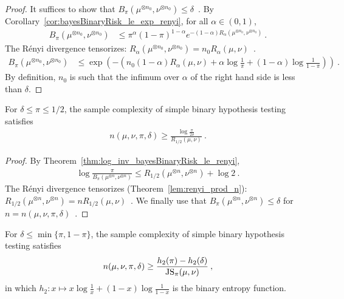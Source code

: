 \begin{proof}%
{}
It suffices to show that $B_\pi(\mu^{\otimes n_0}, \nu^{\otimes n_0}) \le \delta$~.
By Corollary~\ref{cor:bayesBinaryRisk_le_exp_renyi}, for all $\alpha \in (0,1)$,
\begin{align*}
B_\pi(\mu^{\otimes n_0}, \nu^{\otimes n_0})
&\le \pi^{\alpha} (1 - \pi)^{1 - \alpha}e^{- (1 - \alpha)R_\alpha(\mu^{\otimes n_0}, \nu^{\otimes n_0})}
\: .
\end{align*}
The Rényi divergence tensorizes: $R_\alpha(\mu^{\otimes n_0}, \nu^{\otimes n_0}) = n_0 R_\alpha(\mu, \nu)$~.
\begin{align*}
B_\pi(\mu^{\otimes n_0}, \nu^{\otimes n_0})
&\le \exp\left(- \left( n_0 (1 - \alpha)R_\alpha(\mu, \nu) + \alpha\log\frac{1}{\pi} + (1 - \alpha)\log\frac{1}{1 - \pi} \right) \right)
\: .
\end{align*}
By definition, $n_0$ is such that the infimum over $\alpha$ of the right hand side is less than $\delta$.
\end{proof}


\begin{lemma}
  \label{lem:binaryPriorSampleComplexity_ge_renyi}
  For $\delta \le \pi \le 1/2$, the sample complexity of simple binary hypothesis testing satisfies
  \begin{align*}
  n(\mu, \nu, \pi, \delta) \ge \frac{\log\frac{\pi}{2\delta}}{R_{1/2}(\mu, \nu)}
  \: .
  \end{align*}
\end{lemma}

\begin{proof}%
{}
By Theorem~\ref{thm:log_inv_bayesBinaryRisk_le_renyi},
\begin{align*}
\log\frac{\pi}{B_\pi(\mu^{\otimes n}, \nu^{\otimes n})} \le R_{1/2}(\mu^{\otimes n}, \nu^{\otimes n}) + \log 2
\: .
\end{align*}
The Rényi divergence tensorizes (Theorem~\ref{lem:renyi_prod_n}): $R_{1/2}(\mu^{\otimes n}, \nu^{\otimes n}) = n R_{1/2}(\mu, \nu)$~.
We finally use that $B_\pi(\mu^{\otimes n}, \nu^{\otimes n}) \le \delta$ for $n = n(\mu, \nu, \pi, \delta)$~.
\end{proof}


\begin{lemma}
  \label{lem:binaryPriorSampleComplexity_ge_jensenShannon}
  For $\delta \le \min\{\pi, 1 - \pi\}$, the sample complexity of simple binary hypothesis testing satisfies
  \begin{align*}
  n(\mu, \nu, \pi, \delta) \ge \frac{h_2(\pi) - h_2(\delta)}{\operatorname{JS}_\pi(\mu, \nu)}
  \: ,
  \end{align*}
  in which $h_2: x \mapsto x\log\frac{1}{x} + (1 - x)\log\frac{1}{1 - x}$ is the binary entropy function.
\end{lemma}

